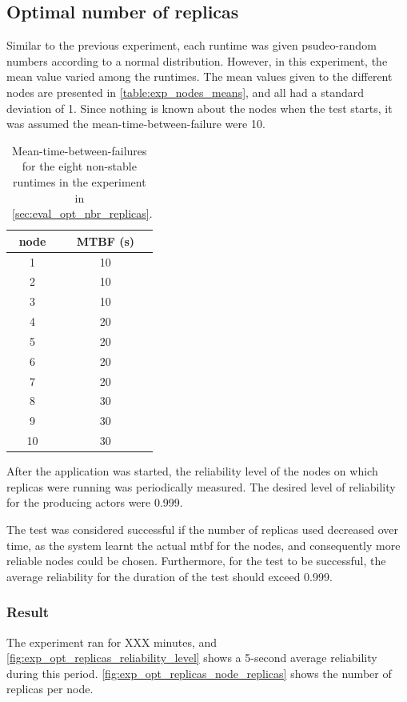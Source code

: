 \documentclass{cslthse-msc}
\begin{document}
\subsection{Optimal number of replicas} \label{sec:eval_opt_nbr_replicas}
Similar to the previous experiment, each runtime was given psudeo-random numbers according to a normal distribution. However, in this experiment, the mean value varied among the runtimes. The mean values given to the different nodes are presented in \autoref{table:exp_nodes_means}, and all had a standard deviation of 1. Since nothing is known about the nodes when the test starts, it was assumed the mean-time-between-failure were 10. 

\begin{table}[h]
	\begin{center}
	\begin{tabular}{| c  | c |}
	 \hline
	 node & MTBF (s)  \\
	 \hline		
	  1 & 10 \\
	  2 & 10 \\
	  3 & 10 \\
	  4 & 20 \\
	  5 & 20 \\
	  6 & 20 \\
	  7 & 20 \\
	  8 & 30 \\
	  9 & 30 \\
	  10 & 30 \\
	   \hline
	\end{tabular}
	 \caption{Mean-time-between-failures for the eight non-stable runtimes in the experiment in ~\autoref{sec:eval_opt_nbr_replicas}.}
	 \end{center}
 \end{table}


After the application was started, the reliability level of the nodes on which replicas were running was periodically measured. The desired level of reliability for the producing actors were 0.999.

The test was considered successful if the number of replicas used decreased over time, as the system learnt the actual mtbf for the nodes, and consequently more reliable nodes could be chosen. Furthermore, for the test to be successful, the average reliability for the duration of the test should exceed 0.999.

\subsubsection*{Result}
The experiment ran for XXX minutes, and \autoref{fig:exp_opt_replicas_reliability_level} shows a 5-second average reliability during this period. \autoref{fig:exp_opt_replicas_node_replicas} shows the number of replicas per node.
\end{document}
